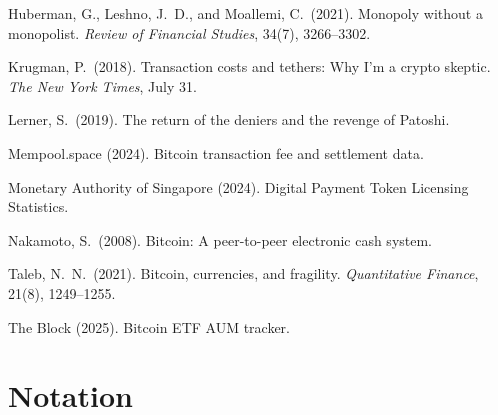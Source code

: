 \documentclass[12pt]{article}
\theoremstyle{definition}
\theoremstyle{remark}
\begin{document}
\begin{description}[style=nextline,leftmargin=0pt,labelsep=0pt,font=\normalfont]
\item Huberman, G., Leshno, J.\ D., and Moallemi, C.\ (2021). Monopoly without a
monopolist. \emph{Review of Financial Studies}, 34(7), 3266--3302.

\item Krugman, P.\ (2018). Transaction costs and tethers: Why I'm a crypto
skeptic. \emph{The New York Times}, July 31.

\item Lerner, S.\ (2019). The return of the deniers and the revenge of Patoshi.

\item Mempool.space (2024). Bitcoin transaction fee and settlement data.

\item Monetary Authority of Singapore (2024). Digital Payment Token Licensing
Statistics.

\item Nakamoto, S.\ (2008). Bitcoin: A peer-to-peer electronic cash system.

\item Taleb, N.\ N.\ (2021). Bitcoin, currencies, and fragility.
\emph{Quantitative Finance}, 21(8), 1249--1255.

\item The Block (2025). Bitcoin ETF AUM tracker.

\end{description}


\appendix

\section{Notation}
\end{document}
